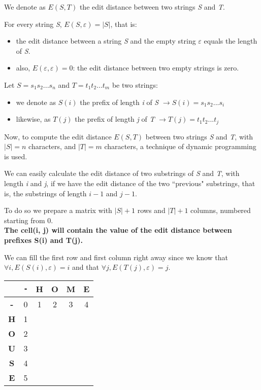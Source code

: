 \documentclass[12pt, letterpaper]{article}
\begin{document}
We denote as $E(S, T)$ the edit distance between two strings \emph{S} and \emph{T}.

For every string \emph{S}, $E(S, \varepsilon) = |S|$, that is:
\begin{itemize}
\item the edit distance between a string \emph{S} and the empty string $\varepsilon$ equals the length of \emph{S}.
\item also, $E(\varepsilon, \varepsilon)=0$: the edit distance between two empty strings is zero.
\end{itemize}

Let $S = s_1s_2...s_n$ and $T = t_1t_2...t_m$ be two strings:
\begin{itemize}
\item we denote as $S(i)$ the prefix of length \emph{i} of \emph{S} $\rightarrow S(i) = s_1s_2...s_i$
\item likewise, as $T(j)$ the prefix of length \emph{j} of \emph{T} $\rightarrow T(j) = t_1t_2...t_j$
\end{itemize}
\newpage

Now, to compute the edit distance $E(S, T)$ between two strings \emph{S} and \emph{T}, with $|S| = n$ characters, and $|T|=m$ characters, a technique of dynamic programming is used. 

We can easily calculate the edit distance of two substrings of \emph{S} and \emph{T}, with length \emph{i} and \emph{j}, if we have the edit distance of the two ``previous" substrings, that is, the substrings of length $i-1$ and $j-1$.

To do so we prepare a matrix with $|S| + 1$ rows and $|T| + 1$ columns, numbered starting from 0.\\

\textbf{The cell(i, j) will contain the value of the edit distance between prefixes S(i) and T(j).}

We can fill the first row and first column right away since we know that $\forall i, E(S(i), \varepsilon) = i$ and that $\forall j, E(T(j), \varepsilon) = j$.

\setlength{\tabcolsep}{18pt}
\renewcommand{\arraystretch}{1.5}
\begin{center}
\begin{tabular}{|c|c|c|c|c|c|}
\hline
& \texttt{-} & \textbf{H} & \textbf{O} & \textbf{M} & \textbf{E} \\
\hline
\textbf{-} & 0 & 1 & 2 & 3 & 4 \\
\hline
\textbf{H} & 1 & & & & \\
\hline
\textbf{O} & 2 & & & & \\
\hline
\textbf{U} & 3 & & & & \\
\hline
\textbf{S} & 4 & & & & \\
\hline
\textbf{E} & 5 & & & & \\
\hline
\end{tabular}
\end{center}
\end{document}
